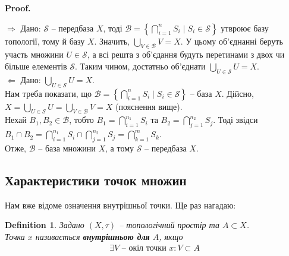 \documentclass[a4paper, 10pt]{article}
\makeatletter
\def\rightproof{$\boxed{\Rightarrow}$ }
\def\leftproof{$\boxed{\Leftarrow}$ }
\theoremstyle{theoremdd}
\newtheorem{definition}[theorem]{Definition}
\newtheorem{example}[theorem]{Example}
\renewenvironment{proof}[1][Proof.\\]{\par
\pushQED{\hfill \qed}%
\normalfont \topsep6\p@\@plus6\p@\relax
\trivlist
\item\relax
{\bfseries
#1\@addpunct{.}}\hspace\labelsep\ignorespaces
}{%
\popQED\endtrivlist\@endpefalse
}
\makeatother
\begin{document}
\begin{proof}
\rightproof Дано: $\mathcal{S}$ -- передбаза $X$, тоді $\mathcal{B} = \displaystyle\left\{ \bigcap_{i=1}^n S_i \mid S_i \in \mathcal{S} \right\}$ утвроює базу топології, тому й базу $X$. Значить, $\displaystyle\bigcup_{V \in \mathcal{B}} V = X$. У цьому об'єднанні беруть участь множини $U \in \mathcal{S}$, а всі решта з об'єдання будуть перетинами з двох чи більше елементів $\mathcal{S}$. Таким чином, достатньо об'єднати $\displaystyle\bigcup_{U \in \mathcal{S}} U = X$.
\bigskip \\
\leftproof Дано: $\displaystyle\bigcup_{U \in \mathcal{S}} U = X$.\\
Нам треба показати, що $\mathcal{B} = \displaystyle\left\{ \bigcap_{i=1}^n S_i \mid S_i \in \mathcal{S} \right\}$ -- база $X$. Дійсно,\\
$X = \displaystyle\bigcup_{U \in \mathcal{S}} U = \bigcup_{V \in \mathcal{B}} V = X$ (пояснення вище).\\
Нехай $B_1,B_2 \in \mathcal{B}$, тобто $\displaystyle B_1 = \bigcap_{i=1}^{n_1} S_i$ та $\displaystyle B_2 = \bigcap_{j=1}^{n_2} S_j$. Тоді звідси $B_1 \cap B_2 = \displaystyle\bigcap_{i=1}^{n_1} S_i \cap \bigcap_{j=1}^{n_2} S_j = \bigcap_{k=1}^{m} S_k$.\\
Отже, $\mathcal{B}$ -- база множини $X$, а тому $\mathcal{S}$ -- передбаза $X$.
\end{proof}

\iffalse
\begin{example}
Зокрема $\mathcal{S} = \{(-\infty,b), (a,+\infty) \mid a,b \in \mathbb{R}\}$ буде передбазою $\mathbb{R}$, причому породжена топологія повністю збігатиметься зі стандартною.\\
Те, що це передбаза, -- цілком зрозуміло, якщо об'єднати всі інтервали. Залишилося довести, що $\tau_{\mathcal{S}} = \tau_{\text{stand}}$.\\
Цілком зрозуміло, що $\tau_{\mathcal{S}} \subset \tau_{\text{stand}}$. Тепер нехай $U \in \tau_{\text{stand}}$. Ми знаємо, що $\tau_{\text{stand}} = \tau_{\mathcal{B}}$, причому $\mathcal{B} = \{(a,b) \mid a,b \in \mathbb{Q}\}$
\end{example}
\fi

\subsection{Характеристики точок множин}
\noindent Нам вже відоме означення внутрішньої точки. Ще раз нагадаю:
\begin{definition}
Задано $(X,\tau)$ -- топологічний простір та $A \subset X$.\\
Точка $x$ називається \textbf{внутрішньою для} $A$, якщо
\begin{align*}
\exists V \text{ -- окіл точки } x: V \subset A
\end{align*}
\end{definition}
\end{document}
